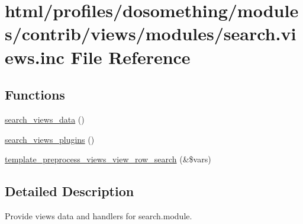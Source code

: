 \hypertarget{search_8views_8inc}{
\section{html/profiles/dosomething/modules/contrib/views/modules/search.views.inc File Reference}
\label{search_8views_8inc}
}
\subsection*{Functions}
\begin{DoxyCompactItemize}
\item 
\hyperlink{search_8views_8inc_ad91fdcb8037644087387a30d3a5719ee}{search\_\-views\_\-data} ()
\item 
\hyperlink{search_8views_8inc_aef27a11e726ee0039e3ffeed38562df3}{search\_\-views\_\-plugins} ()
\item 
\hyperlink{search_8views_8inc_ad2005db0a4841d084cadac887649bf6f}{template\_\-preprocess\_\-views\_\-view\_\-row\_\-search} (\&\$vars)
\end{DoxyCompactItemize}


\subsection{Detailed Description}
Provide views data and handlers for search.module. 

